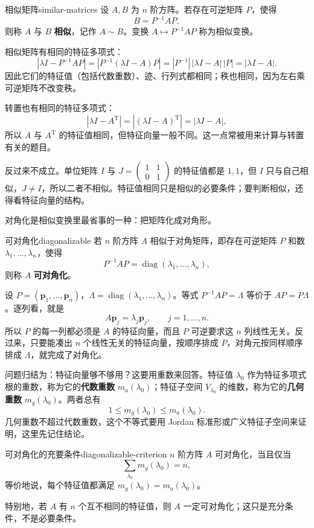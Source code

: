 \begin{mydef}{相似矩阵}{similar-matrices}
设 \(A,B\) 为 \(n\) 阶方阵。若存在可逆矩阵 \(P\)，使得
\[
B=P^{-1}AP,
\]
则称 \(A\) 与 \(B\) \textbf{相似}，记作 \(A\sim B\)。变换 \(A\mapsto P^{-1}AP\) 称为相似变换。
\end{mydef}

相似矩阵有相同的特征多项式：
\[
|\lambda I-P^{-1}AP|
=|P^{-1}(\lambda I-A)P|
=|P^{-1}|\,|\lambda I-A|\,|P|
=|\lambda I-A|.
\]
因此它们的特征值（包括代数重数）、迹、行列式都相同；秩也相同，因为左右乘可逆矩阵不改变秩。

转置也有相同的特征多项式：
\[
|\lambda I-A^{\mathrm{T}}|=|(\lambda I-A)^{\mathrm{T}}|=|\lambda I-A|,
\]
所以 \(A\) 与 \(A^{\mathrm{T}}\) 的特征值相同，但特征向量一般不同。这一点常被用来计算与转置有关的题目。

反过来不成立。单位矩阵 \(I\) 与 \(J=\begin{pmatrix}1&1\\0&1\end{pmatrix}\) 的特征值都是 \(1,1\)，但 \(I\) 只与自己相似，\(J\neq I\)，所以二者不相似。特征值相同只是相似的必要条件；要判断相似，还得看特征向量的结构。

对角化是相似变换里最省事的一种：把矩阵化成对角形。

\begin{mydef}{可对角化}{diagonalizable}
若 \(n\) 阶方阵 \(A\) 相似于对角矩阵，即存在可逆矩阵 \(P\) 和数 \(\lambda_1,\dots,\lambda_n\)，使得
\[
P^{-1}AP=\operatorname{diag}(\lambda_1,\dots,\lambda_n),
\]
则称 \(A\) \textbf{可对角化}。
\end{mydef}

设 \(P=(\mathbf{p}_1,\dots,\mathbf{p}_n)\)，\(\Lambda=\operatorname{diag}(\lambda_1,\dots,\lambda_n)\)。等式 \(P^{-1}AP=\Lambda\) 等价于 \(AP=P\Lambda\)。逐列看，就是
\[
A\mathbf{p}_j=\lambda_j\mathbf{p}_j,\qquad j=1,\dots,n.
\]
所以 \(P\) 的每一列都必须是 \(A\) 的特征向量，而且 \(P\) 可逆要求这 \(n\) 列线性无关。反过来，只要能凑出 \(n\) 个线性无关的特征向量，按顺序排成 \(P\)，对角元按同样顺序排成 \(\Lambda\)，就完成了对角化。

问题归结为：特征向量够不够用？这要用重数来回答。特征值 \(\lambda_0\) 作为特征多项式根的重数，称为它的\textbf{代数重数} \(m_a(\lambda_0)\)；特征子空间 \(V_{\lambda_0}\) 的维数，称为它的\textbf{几何重数} \(m_g(\lambda_0)\)。两者总有
\[
1\le m_g(\lambda_0)\le m_a(\lambda_0).
\]
几何重数不超过代数重数，这个不等式要用 Jordan 标准形或广义特征子空间来证明，这里先记住结论。

\begin{conclusion}{可对角化的充要条件}{diagonalizable-criterion}
\(n\) 阶方阵 \(A\) 可对角化，当且仅当
\[
\sum_{\lambda_0} m_g(\lambda_0)=n,
\]
等价地说，每个特征值都满足 \(m_g(\lambda_0)=m_a(\lambda_0)\)。

特别地，若 \(A\) 有 \(n\) 个互不相同的特征值，则 \(A\) 一定可对角化；这只是充分条件，不是必要条件。
\end{conclusion}

